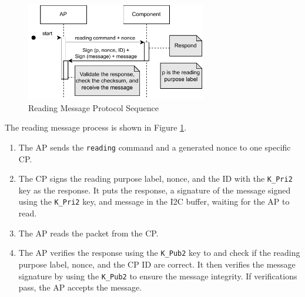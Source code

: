 \documentclass[11pt,oneside,onecolumn,letterpaper]{article}
\begin{document}
	\begin{figure}[h]
		\centering
		\includegraphics[width=0.7\textwidth]{pics/post2.pdf}
		\caption{Reading Message Protocol Sequence}
		\label{fig:functionality_post2}
	\end{figure}
	
	The reading message process is shown in Figure \ref{fig:functionality_post2}.
	\begin{enumerate}
		\item The AP sends the \texttt{reading} command and a generated nonce to one specific CP.
		\item The CP signs the reading purpose label,
		nonce,
		and the ID with the \texttt{K\_Pri2} key as the response.
		It puts the response,
		a signature of the message signed using the \texttt{K\_Pri2} key,
		and message in the I2C buffer,
		waiting for the AP to read.
		\item The AP reads the packet from the CP.
		\item The AP verifies the response using the \texttt{K\_Pub2} key to and check if the reading purpose label,
		nonce,
		and the CP ID are correct.
		It then verifies the message signature by using the \texttt{K\_Pub2} to ensure the message integrity.
		If verifications pass,
		the AP accepts the message.
	\end{enumerate}
	
\end{document}
